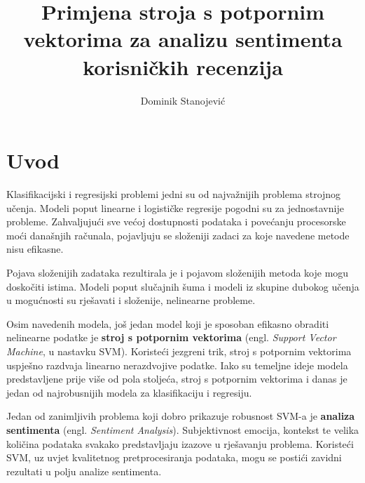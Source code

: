 \documentclass[times, utf8, zavrsni, numeric]{fer}
\begin{document}

\title{Primjena stroja s potpornim vektorima za analizu sentimenta korisničkih recenzija}

\author{Dominik Stanojević}

\maketitle

\izvornik

\zahvala{}

\tableofcontents

\chapter{Uvod}

\par Klasifikacijski i regresijski problemi jedni su od najvažnijih problema strojnog učenja. 
Modeli poput linearne i logističke regresije pogodni su za jednostavnije probleme.
Zahvaljujući sve većoj dostupnosti podataka i povećanju procesorske moći današnjih računala,
pojavljuju se složeniji zadaci za koje navedene metode nisu efikasne.

\par Pojava složenijih zadataka rezultirala je i pojavom složenijih metoda koje mogu doskočiti 
istima. Modeli poput slučajnih šuma i modeli iz skupine dubokog učenja u mogućnosti su rješavati i složenije, 
nelinearne probleme.

\par Osim navedenih modela, još jedan model koji je sposoban efikasno obraditi nelinearne podatke 
je \textbf{stroj s potpornim vektorima} (engl. \textit{Support Vector Machine}, u nastavku SVM).
Koristeći jezgreni trik, stroj s potpornim vektorima uspješno razdvaja linearno nerazdvojive podatke.
Iako su temeljne ideje modela predstavljene prije više od pola stoljeća, stroj s potpornim vektorima i danas je jedan od
najrobusnijih modela za klasifikaciju i regresiju.

\par Jedan od zanimljivih problema koji dobro prikazuje robusnost SVM-a je \textbf{analiza sentimenta}
(engl. \textit{Sentiment Analysis}).
Subjektivnost emocija, kontekst te velika količina podataka svakako predstavljaju izazove u rješavanju problema.
Koristeći SVM, uz uvjet kvalitetnog pretprocesiranja podataka, mogu se postići zavidni rezultati u polju analize sentimenta.
\end{document}
